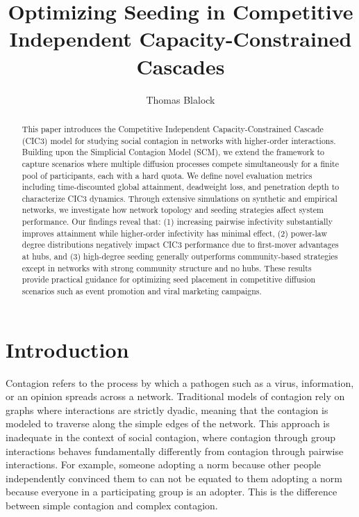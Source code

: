 \documentclass[sigconf]{acmart}
\begin{document}
\title{Optimizing Seeding in Competitive Independent Capacity-Constrained Cascades}

\author{Thomas Blalock}

\begin{abstract}
This paper introduces the Competitive Independent Capacity-Constrained Cascade (CIC3) model for studying social contagion in networks with higher-order interactions. Building upon the Simplicial Contagion Model (SCM), we extend the framework to capture scenarios where multiple diffusion processes compete simultaneously for a finite pool of participants, each with a hard quota. We define novel evaluation metrics including time-discounted global attainment, deadweight loss, and penetration depth to characterize CIC3 dynamics. Through extensive simulations on synthetic and empirical networks, we investigate how network topology and seeding strategies affect system performance. Our findings reveal that: (1) increasing pairwise infectivity substantially improves attainment while higher-order infectivity has minimal effect, (2) power-law degree distributions negatively impact CIC3 performance due to first-mover advantages at hubs, and (3) high-degree seeding generally outperforms community-based strategies except in networks with strong community structure and no hubs. These results provide practical guidance for optimizing seed placement in competitive diffusion scenarios such as event promotion and viral marketing campaigns.
\end{abstract}

\maketitle

\section{Introduction}
\label{sec:intro}

Contagion refers to the process by which a pathogen such as a virus, information, or an opinion spreads across a network. Traditional models of contagion rely on graphs where interactions are strictly dyadic, meaning that the contagion is modeled to traverse along the simple edges of the network. This approach is inadequate in the context of social contagion, where contagion through group interactions behaves fundamentally differently from contagion through pairwise interactions. For example, someone adopting a norm because other people independently convinced them to can not be equated to them adopting a norm because everyone in a participating group is an adopter. This is the difference between simple contagion and complex contagion.
\end{document}
